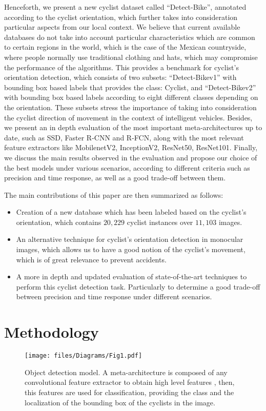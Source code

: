 \documentclass[journal]{IEEEtran}
\begin{document}
Henceforth, we present a new cyclist dataset called ``Detect-Bike'', annotated according to the cyclist orientation, which further takes into consideration particular aspects from our local context. We believe that current available databases do not take into account particular characteristics which are common to certain regions in the world, which is the case of the Mexican countryside, where people normally use traditional clothing and hats, which may compromise the performance of the algorithms. This provides a benchmark for cyclist's orientation detection, which consists of two subsets: ``Detect-Bikev1'' with bounding box based labels that provides the class: Cyclist, and ``Detect-Bikev2'' with bounding box based labels according to eight different classes depending on the orientation. These subsets stress the importance of taking into consideration the cyclist direction of movement in the context of intelligent vehicles. Besides, we present an in depth evaluation of the most important meta-architectures up to date, such as SSD, Faster R-CNN and R-FCN, along with the most relevant feature extractors like MobilenetV2, InceptionV2, ResNet50, ResNet101. Finally, we discuss the main results observed in the evaluation and propose our choice of the best models under various scenarios, according to different criteria such as precision and time response, as well as a good trade-off between them.

The main contributions of this paper are then summarized as follows:
\begin{itemize}
  \item Creation of a new database which has been labeled based on the cyclist's orientation, which contains $20,229$ cyclist instances over $11,103$ images. 
  \item An alternative technique for cyclist's orientation detection in monocular images, which allows us to have a good notion of the cyclist's movement,  which is of great relevance to prevent accidents.
  \item A more in depth and updated evaluation of state-of-the-art techniques to perform this cyclist detection task. Particularly to determine a good trade-off between precision and time response under different scenarios.
\end{itemize}

\section{Methodology}
\label{sec:methodology}
\begin{figure}[!t]
\centering\texttt{[image: files/Diagrams/Fig1.pdf]}
\caption{Object detection model. A meta-architecture is composed of any convolutional feature extractor to obtain high level features \cite{huang2017speed}, then, this features are used for classification, providing the class and the localization of the bounding box of the cyclists in the image.}
\label{fig:ObjectDetectionModel}
\end{figure}
\end{document}
